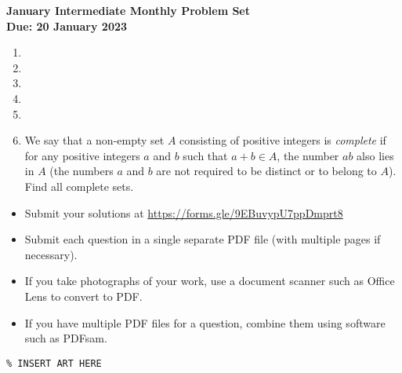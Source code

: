 \documentclass{article}
\begin{document}
\thispagestyle{empty}

\begin{center}
  \textbf{\Large January Intermediate Monthly Problem Set}
  \\ \vspace{1em}
  \textbf{\large Due: 20 January 2023}
\end{center}

\bigskip \bigskip

\begin{enumerate}[itemsep=\fill]

\item %

 
\item %


\item %


\item %


\item %

\item %
We say that a non-empty set $A$ consisting of positive integers is \textit{complete} if for any positive integers $a$ and $b$ such that $a+b\in A$, the number $ab$ also lies in $A$ (the numbers $a$ and $b$ are not required to be distinct or to belong to $A$). Find all complete sets.

\end{enumerate}


\vfill
\small
\begin{itemize}
	\item Submit your solutions at \href{https://forms.gle/9EBuvypU7ppDmprt8}{https://forms.gle/9EBuvypU7ppDmprt8}
	\item Submit each question in a single separate PDF file (with multiple pages if necessary).
	\item If you take photographs of your work, use a document scanner such as Office Lens to convert to PDF.
	\item If you have multiple PDF files for a question, combine them using software such as PDFsam.
\end{itemize}

\vfill
\centering
\small
\begin{BVerbatim}
\end{BVerbatim}
\end{document}
